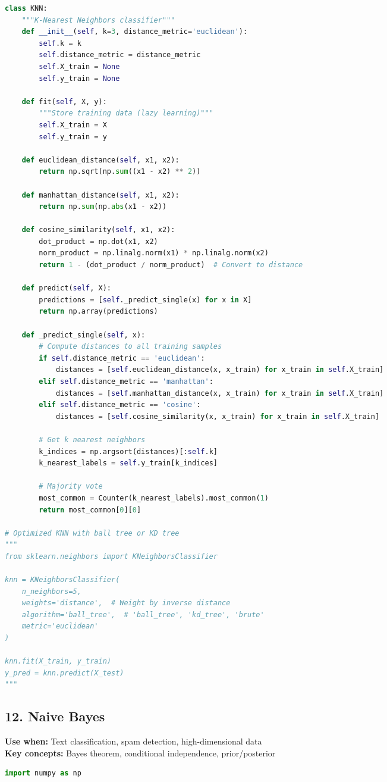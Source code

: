 \documentclass[8pt,landscape]{article}
\begin{document}
\begin{multicols}{3}
\begin{lstlisting}[language=Python]
class KNN:
    """K-Nearest Neighbors classifier"""
    def __init__(self, k=3, distance_metric='euclidean'):
        self.k = k
        self.distance_metric = distance_metric
        self.X_train = None
        self.y_train = None

    def fit(self, X, y):
        """Store training data (lazy learning)"""
        self.X_train = X
        self.y_train = y

    def euclidean_distance(self, x1, x2):
        return np.sqrt(np.sum((x1 - x2) ** 2))

    def manhattan_distance(self, x1, x2):
        return np.sum(np.abs(x1 - x2))

    def cosine_similarity(self, x1, x2):
        dot_product = np.dot(x1, x2)
        norm_product = np.linalg.norm(x1) * np.linalg.norm(x2)
        return 1 - (dot_product / norm_product)  # Convert to distance

    def predict(self, X):
        predictions = [self._predict_single(x) for x in X]
        return np.array(predictions)

    def _predict_single(self, x):
        # Compute distances to all training samples
        if self.distance_metric == 'euclidean':
            distances = [self.euclidean_distance(x, x_train) for x_train in self.X_train]
        elif self.distance_metric == 'manhattan':
            distances = [self.manhattan_distance(x, x_train) for x_train in self.X_train]
        elif self.distance_metric == 'cosine':
            distances = [self.cosine_similarity(x, x_train) for x_train in self.X_train]

        # Get k nearest neighbors
        k_indices = np.argsort(distances)[:self.k]
        k_nearest_labels = self.y_train[k_indices]

        # Majority vote
        most_common = Counter(k_nearest_labels).most_common(1)
        return most_common[0][0]

# Optimized KNN with ball tree or KD tree
"""
from sklearn.neighbors import KNeighborsClassifier

knn = KNeighborsClassifier(
    n_neighbors=5,
    weights='distance',  # Weight by inverse distance
    algorithm='ball_tree',  # 'ball_tree', 'kd_tree', 'brute'
    metric='euclidean'
)

knn.fit(X_train, y_train)
y_pred = knn.predict(X_test)
"""
\end{lstlisting}

\subsection*{12. Naive Bayes}
\textbf{Use when:} Text classification, spam detection, high-dimensional data \\
\textbf{Key concepts:} Bayes theorem, conditional independence, prior/posterior
\begin{lstlisting}[language=Python]
import numpy as np


\end{lstlisting}
\end{multicols}
\end{document}
